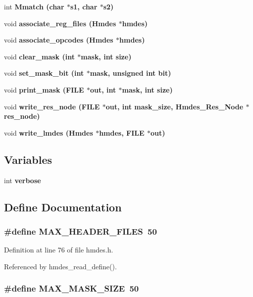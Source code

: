 \begin{CompactItemize}
int \bf{Mmatch} (char $\ast$s1, char $\ast$s2)
\item 
void \bf{associate\_\-reg\_\-files} (\bf{Hmdes} $\ast$hmdes)
\item 
void \bf{associate\_\-opcodes} (\bf{Hmdes} $\ast$hmdes)
\item 
void \bf{clear\_\-mask} (int $\ast$mask, int size)
\item 
void \bf{set\_\-mask\_\-bit} (int $\ast$mask, unsigned int bit)
\item 
void \bf{print\_\-mask} (FILE $\ast$out, int $\ast$mask, int size)
\item 
void \bf{write\_\-res\_\-node} (FILE $\ast$out, int mask\_\-size, \bf{Hmdes\_\-Res\_\-Node} $\ast$res\_\-node)
\item 
void \bf{write\_\-lmdes} (\bf{Hmdes} $\ast$hmdes, FILE $\ast$out)
\end{CompactItemize}
\subsection*{Variables}
\begin{CompactItemize}
\item 
int \bf{verbose}
\end{CompactItemize}


\subsection{Define Documentation}
\subsubsection{\setlength{\rightskip}{0pt plus 5cm}\#define MAX\_\-HEADER\_\-FILES~50}\label{hmdes_8h_3c4b12b095a395929d29e131bd140819}




Definition at line 76 of file hmdes.h.

Referenced by hmdes\_\-read\_\-define().
\subsubsection{\setlength{\rightskip}{0pt plus 5cm}\#define MAX\_\-MASK\_\-SIZE~50}\label{hmdes_8h_b28a82e5fcd0042f52dda8a7d0791904}




